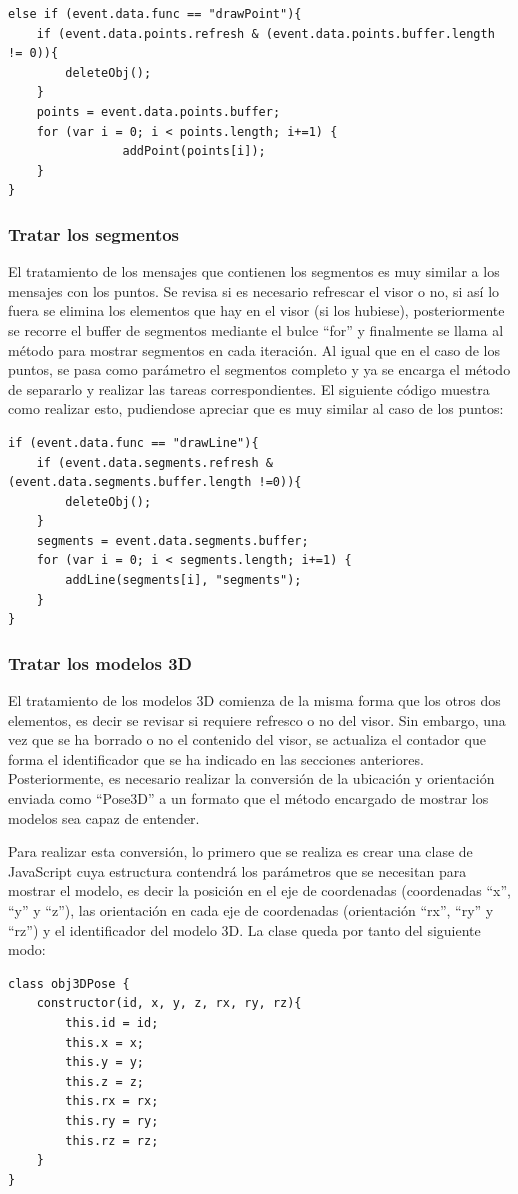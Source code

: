 \begin{lstlisting}[frame=single]
else if (event.data.func == "drawPoint"){
	if (event.data.points.refresh & (event.data.points.buffer.length != 0)){
		deleteObj();
	}
	points = event.data.points.buffer;
	for (var i = 0; i < points.length; i+=1) {
        		addPoint(points[i]);
	}
}
\end{lstlisting}

\subsubsection{Tratar los segmentos}
El tratamiento de los mensajes que contienen los segmentos es muy similar a los mensajes con los puntos. Se revisa si es necesario refrescar el visor o no, si así lo fuera se elimina los elementos que hay en el visor (si los hubiese), posteriormente se recorre el buffer de segmentos mediante el bulce ``for'' y finalmente se llama al método para mostrar segmentos en cada iteración. Al igual que en el caso de los puntos, se pasa como parámetro el segmentos completo y ya se encarga el método de separarlo y realizar las tareas correspondientes. El siguiente código muestra como realizar esto, pudiendose apreciar que es muy similar al caso de los puntos:

\begin{lstlisting}[frame=single]
if (event.data.func == "drawLine"){
	if (event.data.segments.refresh & (event.data.segments.buffer.length !=0)){
		deleteObj();
	}
	segments = event.data.segments.buffer;
	for (var i = 0; i < segments.length; i+=1) {
		addLine(segments[i], "segments");
	}
}
\end{lstlisting}

\subsubsection{Tratar los modelos 3D}
El tratamiento de los modelos 3D comienza de la misma forma que los otros dos elementos, es decir se revisar si requiere refresco o no del visor. Sin embargo, una vez que se ha borrado o no el contenido del visor, se actualiza el contador que forma el identificador que se ha indicado en las secciones anteriores. Posteriormente, es necesario realizar la conversión de la ubicación y orientación enviada como ``Pose3D'' a un formato que el método encargado de mostrar los modelos sea capaz de entender.

Para realizar esta conversión, lo primero que se realiza es crear una clase de JavaScript cuya estructura contendrá los parámetros que se necesitan para mostrar el modelo, es decir la posición en el eje de coordenadas (coordenadas ``x'', ``y'' y ``z''), las orientación en cada eje de coordenadas (orientación ``rx'', ``ry'' y ``rz'') y el identificador del modelo 3D. La clase queda por tanto del siguiente modo:
\begin{lstlisting}[frame=single]
class obj3DPose {
	constructor(id, x, y, z, rx, ry, rz){
		this.id = id;
		this.x = x;
		this.y = y;
		this.z = z;
		this.rx = rx;
		this.ry = ry;
		this.rz = rz;
	}
}
\end{lstlisting}

